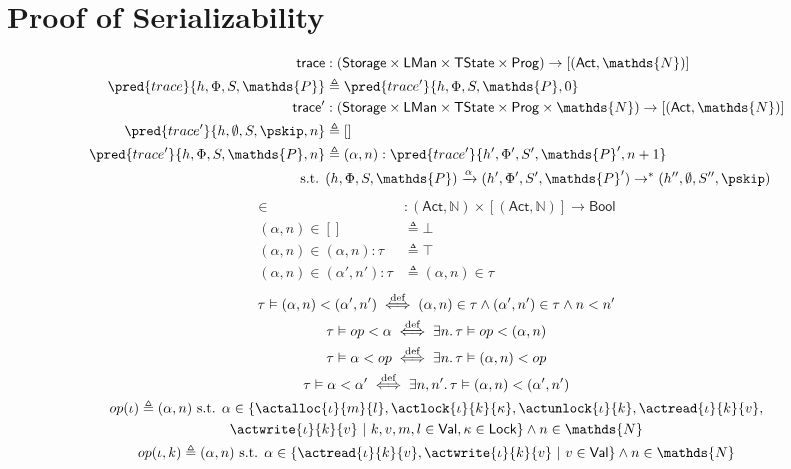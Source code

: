 \section{Proof of Serializability}

\begin{align*}
\mathsf{trace} &: (\mathsf{Storage} \times \mathsf{LMan} \times \mathsf{TState} \times \mathsf{Prog}) \rightarrow [(\mathsf{Act}, \mathds{N})] \\
\pred{trace}{h, \Phi, S, \mathds{P}} &\triangleq \pred{trace'}{h, \Phi, S, \mathds{P}, 0} \\
\mathsf{trace'} &: (\mathsf{Storage} \times \mathsf{LMan} \times \mathsf{TState} \times \mathsf{Prog} \times \mathds{N}) \rightarrow [(\mathsf{Act}, \mathds{N})] \\
\pred{trace'}{h, \emptyset, S, \pskip, n} &\triangleq [] \\
\pred{trace'}{h, \Phi, S, \mathds{P}, n} &\triangleq (\alpha, n) : \pred{trace'}{h', \Phi', S', \mathds{P}', n+ 1}
\\
\text{s.t. }& (h, \Phi, S, \mathds{P}) \xrightarrow{\alpha} (h', \Phi', S', \mathds{P}') \rightarrow^* (h'', \emptyset, S'', \pskip)
\end{align*}
\begin{align*}
\in &: (\mathsf{Act}, \mathds{N}) \times [(\mathsf{Act}, \mathds{N})] \rightarrow \mathsf{Bool} \\
(\alpha, n) \in [] &\triangleq \bot \\
(\alpha, n) \in (\alpha, n):\tau &\triangleq \top \\
(\alpha, n) \in (\alpha', n'):\tau &\triangleq (\alpha, n) \in \tau
\end{align*}
\begin{gather*}
\tau \vDash (\alpha, n) < (\alpha', n') \overset{\text{def}}{\iff}
(\alpha, n) \in \tau \land (\alpha', n') \in \tau \land n < n'
\\
\tau \vDash op < \alpha \overset{\text{def}}{\iff}
\exists n \ldotp \tau \vDash op < (\alpha, n)
\\
\tau \vDash \alpha < op \overset{\text{def}}{\iff}
\exists n \ldotp \tau \vDash (\alpha, n) < op
\\
\tau \vDash \alpha < \alpha' \overset{\text{def}}{\iff}
\exists n, n' \ldotp \tau \vDash (\alpha, n) < (\alpha', n')
\\
op(\iota) \triangleq (\alpha, n) \text{ s.t. } \alpha \in \{ \actalloc{\iota}{m}{l}, \actlock{\iota}{k}{\kappa}, \actunlock{\iota}{k}, \actread{\iota}{k}{v}, \\ \actwrite{\iota}{k}{v}\ |\ k, v, m, l \in \mathsf{Val}, \kappa \in \mathsf{Lock} \} \land n \in \mathds{N}
\\
op(\iota, k) \triangleq (\alpha, n) \text{ s.t. } \alpha \in \{ \actread{\iota}{k}{v}, \actwrite{\iota}{k}{v}\ |\ v \in \mathsf{Val} \} \land n \in \mathds{N}
\end{gather*}

